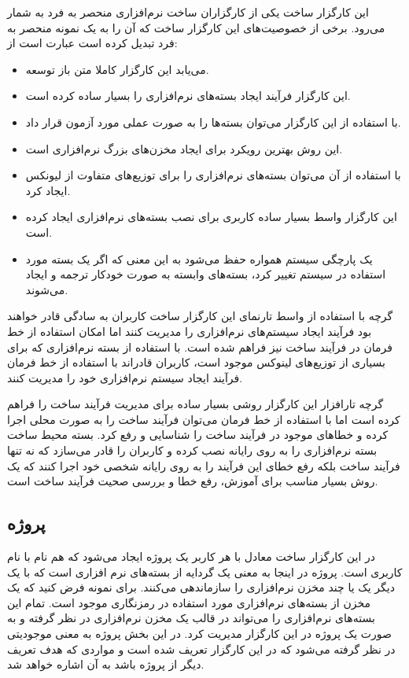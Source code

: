 این کارگزار ساخت یکی از کارگزاران ساخت نرم‌افزاری منحصر به فرد به شمار می‌رود.
برخی از خصوصیت‌های این کارگزار ساخت که آن را به یک نمونه منحصر به فرد تبدیل کرده
است عبارت است از:

\begin{itemize}
  \item می‌یابد این کارگزار کاملا متن باز توسعه.
  \item این کارگزار فرآیند ایجاد بسته‌های نرم‌افزاری را بسیار ساده کرده است.
  \item با استفاده از این کارگزار می‌توان بسته‌ها را به صورت عملی مورد آزمون
  قرار داد.
  \item این روش بهترین رویکرد برای ایجاد مخزن‌های بزرگ نرم‌افزاری است.
  \item با استفاده از آن می‌توان بسته‌های نرم‌افزاری را برای توزیع‌های متفاوت از
  لیونکس ایجاد کرد.
  \item این کارگزار واسط بسیار ساده کاربری برای نصب بسته‌های نرم‌افزاری ایجاد
  کرده است.
  \item یک پارچگی سیستم همواره حفظ می‌شود به این معنی که اگر یک بسته مورد
  استفاده در سیستم تغییر کرد، بسته‌های وابسته به صورت خودکار ترجمه و ایجاد
  می‌شوند.
\end{itemize}

گرچه با استفاده از واسط تارنمای این کارگزار ساخت کاربران به سادگی قادر خواهند
بود فرآیند ایجاد سیستم‌های نرم‌افزاری را مدیریت کنند اما امکان استفاده از خط
فرمان در فرآیند ساخت نیز فراهم شده است. با استفاده از بسته نرم‌افزاری 
که برای بسیاری از توزیع‌های لینوکس موجود است، کاربران قادراند با استفاده از خط
فرمان فرآیند ایجاد سیستم نرم‌افزاری خود را مدیریت کنند.

گرچه تارافزار این کارگزار روشی بسیار ساده برای مدیریت فرآیند ساخت را فراهم کرده
است اما با استفاده از خط فرمان می‌توان فرآیند ساخت را به صورت محلی اجرا کرده و
خطاهای موجود در فرآیند ساخت را شناسایی و رفع کرد. بسته  محیط ساخت
بسته نرم‌افزاری را به روی رایانه نصب کرده و کاربران را قادر می‌سازد که نه تنها
فرآیند ساخت بلکه رفع خطای این فرآیند را به روی رایانه شخصی خود اجرا کنند که یک
روش بسیار مناسب برای آموزش، رفع خطا و بررسی صحیت فرآیند ساخت است.

\subsection{پروژه}

در این کارگزار ساخت معادل با هر کاربر یک پروژه ایجاد می‌شود که هم نام با نام
کاربری است. پروژه در اینجا به معنی یک گردایه از بسته‌های نرم افزاری است که با یک
دیگر یک یا چند مخزن نرم‌افزاری را سازماندهی می‌کنند. برای نمونه فرض کنید که یک
مخزن از بسته‌های نرم‌افزاری مورد استفاده در رمزنگاری موجود است. تمام این
بسته‌های نرم‌افزاری را می‌تواند در قالب یک مخزن نرم‌افزاری در نظر گرفته و به
صورت یک پروژه در این کارگزار مدیریت کرد. در این بخش پروژه به معنی موجودیتی در
نظر گرفته می‌شود که در این کارگزار تعریف شده است و مواردی که هدف تعریف دیگر از
پروژه باشد به آن اشاره خواهد شد.


